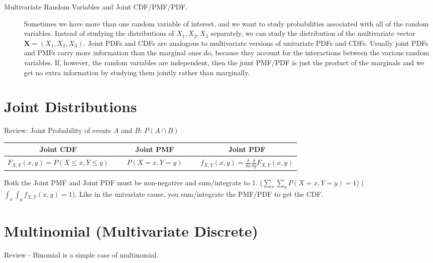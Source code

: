 \documentclass[11pt]{article}
\begin{document}
\begin{description}
\item[Multivariate Random Variables and Joint CDF/PMF/PDF.] Sometimes we have more than one random variable of interest, and we want to study probabilities associated with all of the random variables. Instead of studying the distributions of $X_1, X_2, X_3$ separately, we can study the distribution of the multivariate vector $\textbf{X} = (X_1, X_2, X_3)$. Joint PDFs and CDFs are analogous to multivariate versions of univariate PDFs and CDFs. Usually joint PDFs and PMFs carry more information than the marginal ones do, because they account for the interactions between the various random variables. If, however, the random variables are independent, then the joint PMF/PDF is just the product of the marginals and we get no extra information by studying them jointly rather than marginally.
\end{description}

\section*{Joint Distributions}
Review: Joint Probability of events $A$ and $B$: $P(A \cap B)$

\begin{table}[h]\begin{center}
  \begin{tabular}{ccccc} \toprule
    \textbf{Joint CDF} & ~ & \textbf{Joint PMF} & ~ & \textbf{Joint PDF} \\  \midrule
    $F_{X, Y}(x, y) = P(X \leq x,Y \leq y)$ & ~ & $P(X=x, Y=y)$ & ~ & $f_{X,Y}(x,y) = \frac{\delta}{\delta x} \frac{\delta}{\delta y}F_{X, Y}(x, y)$ \\ \bottomrule
  \end{tabular}\end{center}
\end{table}

Both the Joint PMF and Joint PDF must be non-negative and sum/integrate to 1. ($\sum_x \sum_y P(X=x, Y=y) = 1$) ($\int_x\int_y f_{X,Y}(x,y) = 1$). Like in the univariate cause, you sum/integrate the PMF/PDF to get the CDF.

\section*{Multinomial (Multivariate Discrete)}

  Review - Binomial is a simple case of multinomial.
\end{document}
